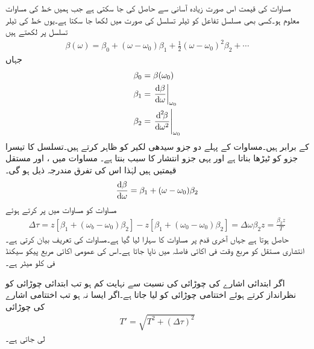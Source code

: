 مساوات  کی قیمت اس صورت زیادہ آسانی سے حاصل کی جا سکتی ہے جب ہمیں  خط کی مساوات  معلوم ہو۔کسی بھی مسلسل تفاعل کو ٹیلر تسلسل کی صورت میں لکھا جا
 سکتا ہے۔یوں  خط کی ٹیلر تسلسل  پر لکھتے ہیں
\begin{align}\label{مساوات_ترچھی_انتشار_کی_ٹیلر_تسلسل}
\beta(\omega)= \beta_0+(\omega-\omega_0)\beta_1+\frac{1}{2}(\omega-\omega_0)^2 \beta_2 +\cdots
\end{align}
جہاں
\begin{align}
\beta_0&=\beta(\omega_0)\\
\beta_1&=\left. \frac{\dif \beta}{\dif \omega} \right|_{\omega_0}\\
\beta_2&=\left. \frac{\dif ^{\,2} \!\!\beta}{\dif \omega^2} \right|_{\omega_0}\label{مساوات_ترچھی_انتشار_کا_مستقل}
\end{align}
کے برابر ہیں۔مساوات  کے پہلے دو جزو سیدھی لکیر کو ظاہر کرتے ہیں۔تسلسل کا تیسرا جزو  کو ٹیڑھا  بناتا ہے اور یہی جزو انتشار کا سبب بنتا ہے۔ مساوات  میں ،  اور  مستقل قیمتیں ہیں لہٰذا اس کی تفرق مندرجہ ذیل ہو گی۔
\begin{align}\label{مساوات_ترچھی_انتشار_ب}
\frac{\dif \beta}{\dif \omega}=\beta_1+(\omega-\omega_0)\beta_2
\end{align}
مساوات  کو مساوات  میں پر کرتے ہوئے
\begin{align}
\Delta \tau=z [\beta_1+(\omega_b-\omega_0)\beta_2]-z [\beta_1+(\omega_0-\omega_0)\beta_2]=\Delta \omega \beta_2 z=\frac{\beta_2 z}{T}
\end{align}
حاصل ہوتا ہے جہاں آخری قدم پر مساوات  کا سہارا لیا گیا ہے۔مساوات    کی تعریف بیان کرتی ہے۔ انتشاری مستقل کو مربع وقت فی اکائی فاصلہ میں ناپا جاتا ہے۔اس کی عمومی اکائی مربع پیکو سیکنڈ فی کلو میٹر  ہے۔

اگر ابتدائی اشارے کی چوڑائی  کی نسبت سے نہایت کم ہو تب ابتدائی چوڑائی کو نظرانداز کرتے ہوئے اختتامی چوڑائی کو  لیا جاتا ہے۔اگر ایسا نہ ہو تب اختتامی اشارے کی چوڑائی
\begin{align}
T'=\sqrt{T^2+(\Delta \tau)^2}
\end{align}
لی جاتی ہے۔

